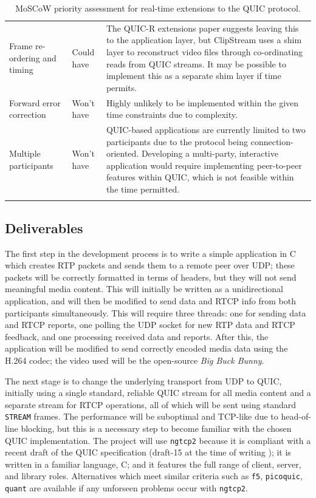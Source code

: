 \documentclass{mprop}
\begin{document}
\begin{longtable}{|p{3.5cm}|l|p{8.5cm}|}
\\ 
Frame re-ordering and timing & Could have & The QUIC-R extensions paper suggests leaving this to the application layer, but ClipStream uses a shim layer to reconstruct video files through co-ordinating reads from QUIC streams. It may be possible to implement this as a separate shim layer if time permits. 

\\ 
Forward error correction & Won't have & Highly unlikely to be implemented within the given time constraints due to complexity. 

\\ 
Multiple participants & Won't have & QUIC-based applications are currently limited to two participants due to the protocol being connection-oriented. Developing a multi-party, interactive application would require implementing peer-to-peer features within QUIC, which is not feasible within the time permitted.\\
\bottomrule
\caption{MoSCoW priority assessment for real-time extensions to the QUIC protocol.}
\label{priority-assessment}
\end{longtable}


\subsection{Deliverables}

The first step in the development process is to write a simple application in C which creates RTP packets and sends them to a remote peer over UDP; these packets will be correctly formatted in terms of headers, but they will not send meaningful media content. This will initially be written as a unidirectional application, and will then be modified to send data and RTCP info from both participants simultaneously. This will require three threads: one for sending data and RTCP reports, one polling the UDP socket for new RTP data and RTCP feedback, and one processing received data and reports. After this, the application will be modified to send correctly encoded media data using the H.264 codec; the video used will be the open-source \textit{Big Buck Bunny}.

The next stage is to change the underlying transport from UDP to QUIC, initially using a single standard, reliable QUIC stream for all media content and a separate stream for RTCP operations, all of which will be sent using standard \texttt{STREAM} frames. The performance will be suboptimal and TCP-like due to head-of-line blocking, but this is a necessary step to become familiar with the chosen QUIC implementation. The project will use \texttt{ngtcp2} because it is compliant with a recent draft of the QUIC specification (draft-15 at the time of writing \cite{quic-implementations}); it is written in a familiar language, C; and it features the full range of client, server, and library roles. Alternatives which meet similar criteria such as \texttt{f5}, \texttt{picoquic}, \texttt{quant} are available if any unforseen problems occur with \texttt{ngtcp2}.
\end{document}
